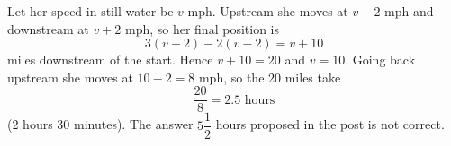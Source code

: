 Let her speed in still water be $v$ mph. Upstream she moves at $v-2$ mph and downstream at $v+2$ mph, so her final position is
\[3(v+2)-2(v-2)=v+10\]
miles downstream of the start. Hence $v+10=20$ and $v=10$. Going back upstream she moves at $10-2=8$ mph, so the $20$ miles take
\[\dfrac{20}{8}=\boxed{2.5\text{ hours}}\]
(2 hours 30 minutes). The answer $5\dfrac{1}{2}$ hours proposed in the post is not correct.

